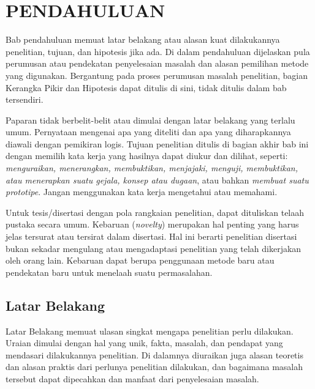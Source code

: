 
\chapter{PENDAHULUAN}

Bab pendahuluan memuat latar belakang atau alasan kuat dilakukannya penelitian,
tujuan, dan hipotesis jika ada.
Di dalam pendahuluan dijelaskan pula perumusan atau pendekatan penyelesaian masalah
dan alasan pemilihan metode yang digunakan.
Bergantung pada proses perumusan masalah penelitian, bagian Kerangka Pikir dan
Hipotesis dapat ditulis di sini, tidak ditulis dalam bab tersendiri.

Paparan tidak berbelit-belit atau dimulai dengan latar belakang yang terlalu umum.
Pernyataan mengenai apa yang diteliti dan apa yang diharapkannya diawali dengan
pemikiran logis.
Tujuan penelitian ditulis di bagian akhir bab ini dengan memilih kata kerja yang
hasilnya dapat diukur dan dilihat, seperti:
\textit{menguraikan, menerangkan, membuktikan, menjajaki, menguji, membuktikan,
atau menerapkan suatu gejala, konsep atau dugaan}, atau bahkan
\textit{membuat suatu prototipe}.
Jangan menggunakan kata kerja mengetahui atau memahami.

Untuk tesis/disertasi dengan pola rangkaian penelitian, dapat dituliskan telaah
pustaka secara umum.
Kebaruan (\textit{novelty}) merupakan hal penting yang harus jelas tersurat atau
tersirat dalam disertasi.
Hal ini berarti penelitian disertasi bukan sekadar mengulang atau mengadaptasi
penelitian yang telah dikerjakan oleh orang lain.
Kebaruan dapat berupa penggunaan metode baru atau pendekatan baru untuk menelaah
suatu permasalahan.


\section{Latar Belakang}

Latar Belakang memuat ulasan singkat mengapa penelitian perlu dilakukan.
Uraian dimulai dengan hal yang unik, fakta, masalah, dan pendapat yang mendasari
dilakukannya penelitian.
Di dalamnya diuraikan juga alasan teoretis dan alasan praktis dari perlunya
penelitian dilakukan, dan bagaimana masalah tersebut dapat dipecahkan dan manfaat
dari penyelesaian masalah.


